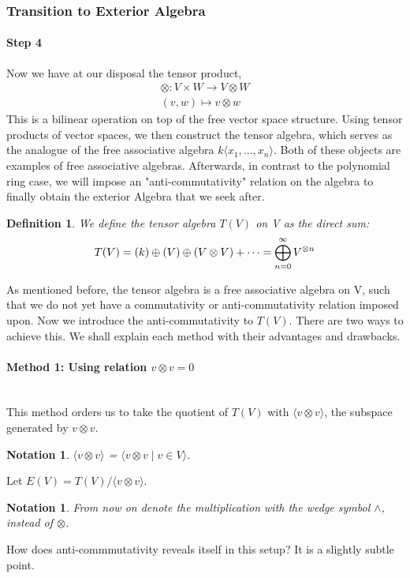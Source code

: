 \documentclass[12pt]{article}
\newtheorem{definition}[theorem]{Definition}
\newtheorem{notation}[theorem]{Notation}
\numberwithin{theorem}{section}
\numberwithin{equation}{theorem}
\begin{document}
\subsubsection{Transition to Exterior Algebra}
\paragraph{Step 4}
Now we have at our disposal the tensor product, 
\begin{gather*}
    \otimes : V \times W \longrightarrow V \otimes W \\
    (v, w) \mapsto v \otimes w
\end{gather*}
This is a bilinear operation on top of the free vector space structure.
Using tensor products of vector spaces, we then construct the tensor algebra, which serves as the analogue of the free associative algebra $k\langle x_1, ..., x_n\rangle$. Both of these objects are examples of free associative algebras. 
Afterwards, in contrast to the polynomial ring case, we will impose an "anti-commutativity" relation on the algebra to finally obtain the exterior Algebra that we seek after.

\begin{definition}
    We define the tensor algebra $T(V)$ on V as the direct sum:
    $$T(V) = \\(k) \oplus (V) \oplus (V \otimes V) + \cdots = \bigoplus_{n = 0}^\infty V^{\otimes n} $$
\end{definition}

As mentioned before, the tensor algebra is a free associative algebra on V, such that we do not yet have a commutativity or anti-commutativity relation imposed upon. Now we introduce the anti-commutativity to $T(V)$. There are two ways to achieve this. We shall explain each method with their advantages and drawbacks.

\paragraph{Method 1: Using relation $v \otimes v = 0$}\mbox{}\\
This method orders us to take the quotient of $T(V)$ with $\langle v \otimes v\rangle$, the subspace generated by $v \otimes v$. 
\begin{notation}
    $\langle v \otimes v\rangle$ = $\langle v \otimes v \mid v \in V \rangle$.
\end{notation}
Let $E(V) = T(V)/\langle v \otimes v\rangle$.
\begin{notation}
    From now on denote the multiplication with the wedge symbol $\wedge$, instead of $\otimes$.   
\end{notation}
How does anti-commmutativity reveals itself in this setup? It is a slightly subtle point.
\end{document}
